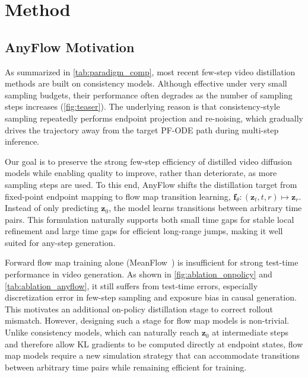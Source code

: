 \section{Method}
\label{sec:method}

\subsection{AnyFlow Motivation}
\label{sec:motivation}

As summarized in \cref{tab:paradigm_comp}, most recent few-step video distillation methods are built on consistency models. Although effective under very small sampling budgets, their performance often degrades as the number of sampling steps increases (\cref{fig:teaser}). The underlying reason is that consistency-style sampling repeatedly performs endpoint projection and re-noising, which gradually drives the trajectory away from the target PF-ODE path during multi-step inference.

 Our goal is to preserve the strong few-step efficiency of distilled video diffusion models while enabling quality to improve, rather than deteriorate, as more sampling steps are used. To this end, AnyFlow shifts the distillation target from fixed-point endpoint mapping to flow map transition learning, \ie $\mathbf{f}_\theta:(\mathbf{z}_t, t, r) \mapsto \mathbf{z}_r$. Instead of only predicting $\mathbf{z}_0$, the model learns transitions between arbitrary time pairs. This formulation naturally supports both small time gaps for stable local refinement and large time gaps for efficient long-range jumps, making it well suited for any-step generation.

 Forward flow map training alone (\eg MeanFlow~\cite{geng2025mean}) is insufficient for strong test-time performance in video generation. As shown in \cref{fig:ablation_onpolicy} and \cref{tab:ablation_anyflow}, it still suffers from test-time errors, especially discretization error in few-step sampling and exposure bias in causal generation. This motivates an additional on-policy distillation stage to correct rollout mismatch. However, designing such a stage for flow map models is non-trivial. Unlike consistency models, which can naturally reach $\mathbf{z}_0$ at intermediate steps and therefore allow KL gradients to be computed directly at endpoint states, flow map models require a new simulation strategy that can accommodate transitions between arbitrary time pairs while remaining efficient for training.

